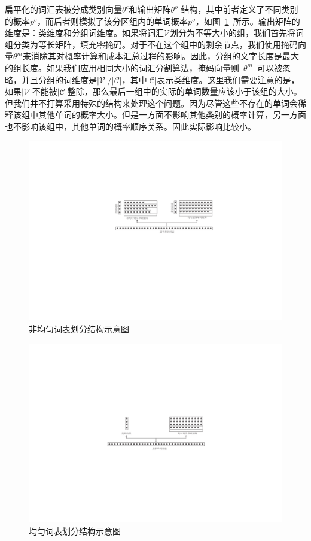 扁平化的词汇表被分成类别向量$ \theta^c $和输出矩阵$ \theta^o $ 结构，其中前者定义了不同类别的概率$ p ^ c $，而后者则模拟了该分区组内的单词概率$ p ^ o $，如图~\ref {fig:chsm}~所示。输出矩阵的维度是：类维度和分组词维度。如果将词汇$ \mathcal {V} $划分为不等大小的组，我们首先将词组分类为等长矩阵，填充零掩码。对于不在这个组中的剩余节点，我们使用掩码向量$ \theta ^ m $来消除其对概率计算和成本汇总过程的影响。因此，分组的文字长度是最大的组长度。如果我们应用相同大小的词汇分割算法，掩码向量则~$\theta^m$~可以被忽略，并且分组的词维度是$ \mathcal {| V | / | C |} $，其中$ \mathcal {| C |} $表示类维度。这里我们需要注意的是，如果$ \mathcal {| V |} $不能被$ \mathcal {| C |} $整除，那么最后一组中的实际的单词数量应该小于该组的大小。但我们并不打算采用特殊的结构来处理这个问题。因为尽管这些不存在的单词会稀释该组中其他单词的概率大小。但是一方面不影响其他类别的概率计算，另一方面也不影响该组中，其他单词的概率顺序关系。因此实际影响比较小。
\begin{figure}[!ht]
  \centering
\includegraphics[width=1\linewidth]{./figures/chsm-simple.pdf}
\caption{非均匀词表划分结构示意图}\label{fig:chsm}
\end{figure}

\begin{figure}[!ht]
  \centering
\includegraphics[width=1\linewidth]{./figures/chsm-simple2.pdf}
\caption{均匀词表划分结构示意图}\label{fig:chsm2}
\end{figure}

